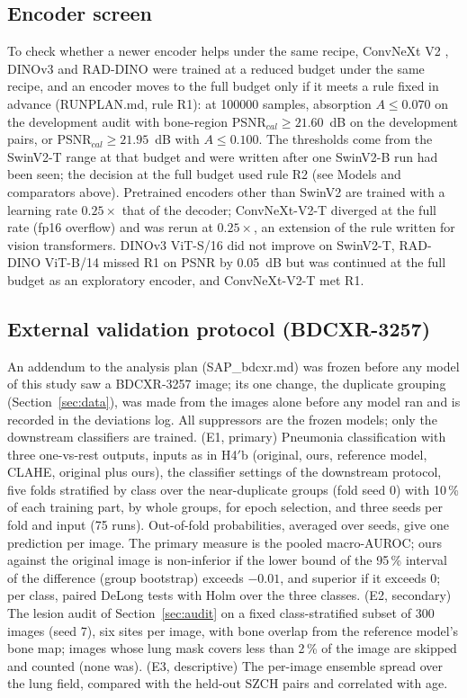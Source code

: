 \subsection{Encoder screen}
\label{sec:encoders}
To check whether a newer encoder helps under the same recipe, ConvNeXt V2 \citep{woo2023convnextv2}, DINOv3 \citep{simeoni2025dinov3} and RAD-DINO
\citep{perezgarcia2025raddino} were trained at a reduced budget under the same recipe, and an encoder moves to the full budget only if
it meets a rule fixed in advance (RUNPLAN.md, rule R1): at \num{100000} samples, absorption $A\le0.070$ on the development audit with
bone-region PSNR$_{cal}\ge21.60$~dB on the development pairs, or PSNR$_{cal}\ge21.95$~dB with $A\le0.100$. The thresholds come from the
SwinV2-T range at that budget and were written after one SwinV2-B run had been seen; the decision at the full budget used rule R2 (see Models and comparators above). Pretrained encoders other than SwinV2 are trained with a learning rate $0.25\times$ that of the decoder;
ConvNeXt-V2-T diverged at the full rate (fp16 overflow) and was rerun at $0.25\times$, an extension of the rule written for vision transformers.
DINOv3 ViT-S/16 did not improve on SwinV2-T, RAD-DINO ViT-B/14 missed R1 on PSNR by 0.05~dB but was continued at the full budget as an
exploratory encoder, and ConvNeXt-V2-T met R1.

\subsection{External validation protocol (BDCXR-3257)}
\label{sec:bdcxr_protocol}
An addendum to the analysis plan (SAP\_bdcxr.md) was frozen before any model of this study saw a BDCXR-3257 image; its one change, the
duplicate grouping (Section~\ref{sec:data}), was made from the images alone before any model ran and is recorded in the deviations log. All
suppressors are the frozen models; only the downstream classifiers are trained. (E1, primary) Pneumonia classification with three one-vs-rest
outputs, inputs as in H4$'$b (original, ours, reference model, CLAHE, original plus ours), the classifier settings of the downstream protocol,
five folds stratified by class over the near-duplicate groups (fold seed 0) with 10\,\% of each training part, by whole groups, for epoch selection,
and three seeds per fold and input (75 runs). Out-of-fold probabilities, averaged over seeds, give one prediction per image. The primary measure
is the pooled macro-AUROC; ours against the original image is non-inferior if the lower bound of the 95\,\% interval of the difference (group
bootstrap) exceeds $-0.01$, and superior if it exceeds 0; per class, paired DeLong tests with Holm over the three classes. (E2, secondary) The
lesion audit of Section~\ref{sec:audit} on a fixed class-stratified subset of 300 images (seed 7), six sites per image, with bone overlap from the
reference model's bone map; images whose lung mask covers less than 2\,\% of the image are skipped and counted (none was). (E3, descriptive) The
per-image ensemble spread over the lung field, compared with the held-out SZCH pairs and correlated with age.

